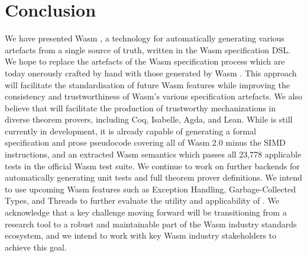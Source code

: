 
\section{Conclusion}
\label{sec:conclusion}

We have presented Wasm \dslname, a technology for automatically
generating various artefacts from a single source of truth, written in the Wasm specification DSL.
We hope to replace the artefacts of the Wasm specification process
which are today onerously crafted by hand with those generated by Wasm \dslname.
This approach will facilitate the standardisation of future Wasm features
while improving the consistency and trustworthiness of Wasm's various specification artefacts. 
We also believe that \dslname will facilitate the production of trustworthy mechanizations
in diverse theorem provers, including Coq, Isabelle, Agda, and Lean.
While \dslname is still currently in development,
it is already capable of generating a formal specification and prose pseudocode covering all of Wasm 2.0 minus the SIMD instructions,
and an extracted Wasm semantics which passes all 23,778 applicable tests in the official Wasm test suite.
%
We continue to work on further backends for automatically generating unit tests and full theorem prover definitions.
%
We intend to use upcoming Wasm features such as Exception Handling,
Garbage-Collected Types, and Threads to further evaluate the utility and applicability of \dslname.
%
We acknowledge that a key challenge moving forward will be transitioning \dslname from a research tool to a robust and maintainable part of the Wasm industry standards ecosystem, and we intend to work with key Wasm industry stakeholders to achieve this goal.
